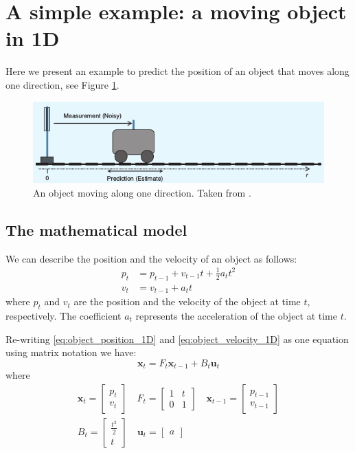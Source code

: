 \documentclass[12pt,a4paper,final]{article} %
\newcommand{\vect}[1]{\mathbf{#1}}
\begin{document}
\section{A simple example: a moving object in 1D}
\label{sec:example1D}
Here we present an example to predict the position of an object that
moves along one direction, see Figure \ref{fig:object_1D_00}.
\begin{figure}
  \centering
  \includegraphics[width=1.0\textwidth]{object_1D_00}
  \caption{An object moving along one direction. Taken from
    \cite{Faragher:2012:ARTICLE}.}
  \label{fig:object_1D_00}
\end{figure}

\subsection{The mathematical model}
We can describe the position and the velocity of an object as follows:
\begin{align}
  p_t &= p_{t-1} + v_{t-1} t + \frac{1}{2} a_t t^2 \label{eq:object_position_1D}\\
  v_t &= v_{t-1} + a_{t} t \label{eq:object_velocity_1D}
\end{align}
where $p_t$ and $v_t$ are the position and the velocity of the object
at time $t$, respectively. The coefficient $a_t$ represents the
acceleration of the object at time $t$.

Re-writing \eqref{eq:object_position_1D} and
\eqref{eq:object_velocity_1D} as one equation using matrix notation we
have:
\begin{equation}
  \label{eq:one_d_matrix_form}
  \vect{x}_t = F_t \vect{x}_{t-1} + B_t \vect{u}_t
\end{equation}
where
\begin{align}
  \vect{x}_t =
  \begin{bmatrix}
    p_t \\
    v_t
  \end{bmatrix}
  \quad
  F_t =
  \begin{bmatrix}
    1 & t\\
    0 & 1
  \end{bmatrix}
  \quad
  \vect{x}_{t-1} =
  \begin{bmatrix}
    p_{t-1} \\
    v_{t-1}
  \end{bmatrix}\\
  B_t = 
  \begin{bmatrix}
    \frac{t^2}{2} \\
    t
  \end{bmatrix}
  \quad
  \vect{u}_t =
  \begin{bmatrix}
    a
  \end{bmatrix}
\end{align}
\end{document}
